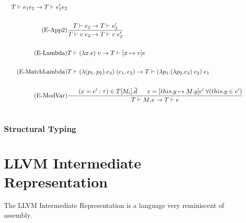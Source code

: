 \documentclass[10pt,a4paper,master=cws, masteroption=ai,english,inputenc=utf8]{kulemt}
\begin{document}
\begin{align*}
{T \vdash e_{1} e_{2} \rightarrow T \vdash e_{1}' e_{2}}\\ \\
\tag{E-App2}
&\frac{T \vdash e_{2} \rightarrow T \vdash e_{2}'}
{T \vdash v\;e_{2} \rightarrow T \vdash v\;e_{2}'}\\ \\
\tag{E-Lambda}
&T \vdash (\lambda x . e) \; v \rightarrow T \vdash [x \mapsto v]e \\ \\
\tag{E-MatchLambda}
&T \vdash (\lambda (p_{1},p_{2}) . e_{3}) \; (e_{1},e_{2}) \rightarrow T \vdash (\lambda p_{1}.(\lambda p_{2}.e_{3})\;e_{2})\; e_{1} \\
\\
\tag{E-ModVar}
&\frac{\;\;\;\;\;\; (x=e':\tau) \in T[M_{i}].\overline{d} \;\;\;\;\;\; e=[this.y\mapsto M.y]e'\;\forall (this.y \in e')}
{T \vdash M.x \rightarrow T \vdash e}\\
\\
\end{align*}

\subsubsection{Structural Typing\label{sec:StructuralTyping}}

\section{LLVM Intermediate Representation}
The LLVM Intermediate Representation is a language very reminiscent of assembly. 
\end{document}
